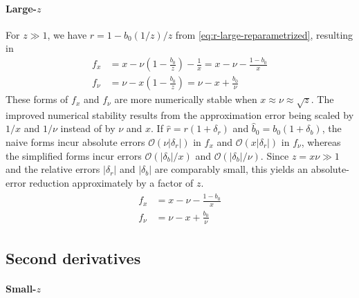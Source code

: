 \documentclass{article}
\begin{document}
\paragraph{Large-$z$}

For $z \gg 1$, we have $r = 1 - b_0(1/z) / z$ from \cref{eq:r-large-reparametrized}, resulting in
%
\begin{align}
  f_x   & = x - \nu (1 - \frac{b_0}{z}) - \frac{1}{x}
  = x - \nu - \frac{1 - b_0}{x}                       \\
  f_\nu & = \nu - x (1 - \frac{b_0}{z})
  = \nu - x + \frac{b_0}{\nu}
\end{align}
%
These forms of $f_x$ and $f_\nu$ are more numerically stable when $x \approx \nu \approx \sqrt{z}$.
The improved numerical stability results from the approximation error being scaled by $1/x$ and $1/\nu$ instead of by $\nu$ and $x$.
If $\hat{r}=r(1+\delta_r)$ and $\hat{b}_0=b_0(1+\delta_b)$, the naive forms incur absolute errors $\mathcal{O}(\nu|\delta_r|)$ in $f_x$ and $\mathcal{O}(x|\delta_r|)$ in $f_\nu$, whereas the simplified forms incur errors $\mathcal{O}(|\delta_b|/x)$ and $\mathcal{O}(|\delta_b|/\nu)$.
Since $z = x\nu \gg 1$ and the relative errors $|\delta_r|$ and $|\delta_b|$ are comparably small, this yields an absolute-error reduction approximately by a factor of $z$.
%
%
\begin{align}\label{eq:first-derivatives-large-z}
  \boxed{
    \begin{aligned}
      f_x   & = x - \nu - \frac{1 - b_0}{x} \\
      f_\nu & = \nu - x + \frac{b_0}{\nu}
    \end{aligned}
  }
\end{align}

\subsection{Second derivatives}\label{sec:rician-second-derivatives}

\paragraph{Small-$z$}
\end{document}
